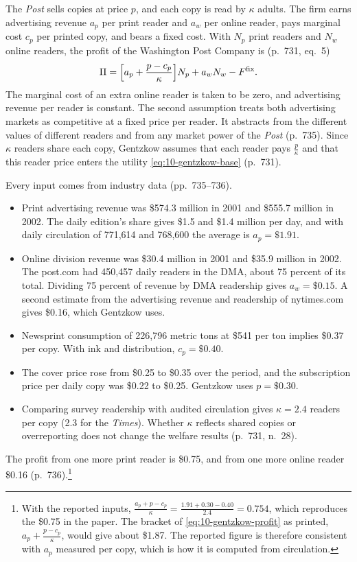  The \textit{Post} sells copies at price $p$, and each copy is read by $\kappa$ adults. The firm
earns advertising revenue $a_p$ per print reader and $a_w$ per online reader, pays marginal cost $c_p$ per printed copy,
and bears a fixed cost. With $N_p$ print readers and $N_w$ online readers, the profit of the Washington Post Company is
(p.~731, eq.~5)
\begin{equation}\label{eq:10-gentzkow-profit}
  \Pi = \Bigl[a_p + \frac{p - c_p}{\kappa}\Bigr]N_p + a_w N_w - F^{\mathrm{fix}} .
\end{equation}
The marginal cost of an extra online reader is taken to be zero, and advertising revenue per reader is constant. The
second assumption treats both advertising markets as competitive at a fixed price per reader. It abstracts from the
different values of different readers and from any market power of the \textit{Post} (p.~735). Since $\kappa$ readers
share each copy, Gentzkow assumes that each reader pays $\frac{p}{\kappa}$ and that this reader price enters the
utility \eqref{eq:10-gentzkow-base} (p.~731).

 Every input comes from industry data (pp.~735--736).
\begin{itemize}
  \item Print advertising revenue was \$574.3 million in 2001 and \$555.7 million in 2002. The daily edition's share
        gives \$1.5 and \$1.4 million per day, and with daily circulation of 771,614 and 768,600 the average is $a_p =
        \$1.91$.
  \item Online division revenue was \$30.4 million in 2001 and \$35.9 million in 2002. The post.com had 450,457 daily
        readers in the DMA, about 75 percent of its total. Dividing 75 percent of revenue by DMA readership gives
        $a_w = \$0.15$. A second estimate from the advertising revenue and readership of nytimes.com gives \$0.16,
        which Gentzkow uses.
  \item Newsprint consumption of 226,796 metric tons at \$541 per ton implies \$0.37 per copy. With ink and distribution,
        $c_p = \$0.40$.
  \item The cover price rose from \$0.25 to \$0.35 over the period, and the subscription price per daily copy was
        \$0.22 to \$0.25. Gentzkow uses $p = \$0.30$.
  \item Comparing survey readership with audited circulation gives $\kappa = 2.4$ readers per copy (2.3 for the
        \textit{Times}). Whether $\kappa$ reflects shared copies or overreporting does not change the welfare results
        (p.~731, n.~28).
\end{itemize}
The profit from one more print reader is \$0.75, and from one more online reader \$0.16 (p.~736).\footnote{With the
reported inputs, $\frac{a_p + p - c_p}{\kappa} = \frac{1.91 + 0.30 - 0.40}{2.4} = 0.754$, which reproduces the \$0.75
in the paper. The bracket of \eqref{eq:10-gentzkow-profit} as printed, $a_p + \frac{p - c_p}{\kappa}$, would give about
\$1.87. The reported figure is therefore consistent with $a_p$ measured per copy, which is how it is computed from
circulation.}

